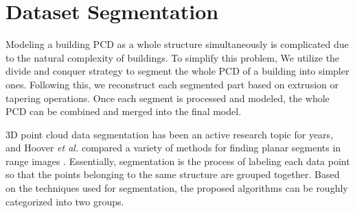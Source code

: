 \section{Dataset Segmentation}
\label{sec:mseg}

Modeling a building PCD as a whole structure simultaneously 
is complicated due to the natural complexity of buildings.
To simplify this problem, 
We utilize the divide and conquer strategy 
to segment the whole PCD of a building into simpler ones.
Following this, we reconstruct each segmented 
part based on extrusion or tapering operations.
Once each segment is processed and modeled, 
the whole PCD can be combined and merged into the final model.

3D point cloud data segmentation has been an active research topic for years,
and Hoover {\it et al.} compared a variety of methods 
for finding planar segments in range images \cite{MS_HOO}.
Essentially, segmentation is the process of labeling each data point
so that the points belonging to the same structure are grouped together.
Based on the techniques used for segmentation, 
the proposed algorithms can be roughly categorized into two groups.


